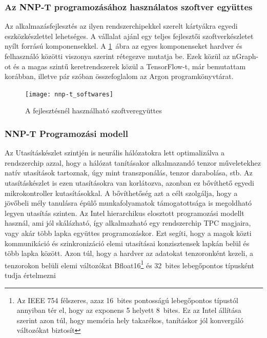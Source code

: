\subsubsection{Az NNP-T programozásához használatos szoftver együttes}
Az alkalmazásfejlesztés az ilyen rendszerchipekkel szerelt kártyákra egyedi eszközkészlettel lehetséges. A vállalat ajánl egy teljes fejlesztői szoftverkészletet nyílt forrású komponensekkel. A \ref{fig:nnp-tSwStack}~ábra az egyes komponenseket hardver és felhasználó közötti viszonya szerint rétegezve mutatja be. Ezek közül az nGraph-ot és a magas szintű keretrendszerek közül a TensorFlow-t, már bemutattam korábban, illetve pár szóban összefoglalom az Argon programkönyvtárat.
\begin{figure}[H]
	\centering
	\texttt{[image: nnp-t\_softwares]}
	\caption[Szoftverek]{A fejlesztésnél használható szoftveregyüttes}
	\label{fig:nnp-tSwStack}
\end{figure}

\subsubsection{NNP-T Programozási modell}
Az Utasításkészlet szintjén is neurális hálózatokra lett optimalizálva a rendszerchip azzal, hogy a hálózat tanításakor alkalmazandó tenzor műveletekhez natív utasítások tartoznak, úgy mint transzponálás, tenzor darabolása, stb. Az utasításkészlet is ezen utasításokra van korlátozva, azonban ez bővíthető egyedi mikrokontroller kutasításokkal. A bővíthetőség azt a célt szolgálja, hogy a jövőbeli mély tanulásra épülő munkafolyamatok támogatottsága is megoldható legyen utasítás szinten. 
Az Intel hierarchikus elosztott programozási modellt használ, ami jól skálázható, így alkalmazható egy rendszerchip TPC magjaira, vagy akár több lapka együttes programozáskor. Ezt segíti, hogy a magok közti kommunikáció és szinkronizáció elemi utasításai konzisztensek lapkán belül és több lapka között.
Azon túl, hogy a hardver az adatokat tenzoronként kezeli, a tenzorokon belüli elemi változókat Bfloat16\footnote{Az IEEE 754 félszeres, azaz 16~bites pontosságú lebegőpontos típustól annyiban tér el, hogy az exponens 5 helyett 8~bites. Ez az Intel állítása szerint azon túl, hogy memória hely takarékos, tanításkor jól konvergáló változókat biztosít} és 32~bites lebegőpontos típusként tudja értelmezni

